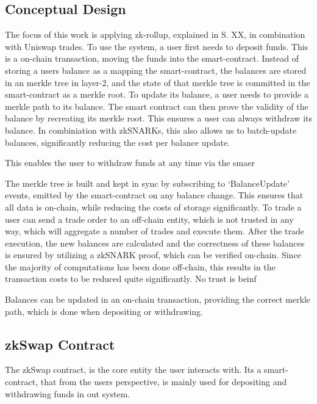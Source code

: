 \documentclass[../../thesis.tex]{subfiles}
\begin{document}
\subsection{Conceptual Design}
The focus of this work is applying zk-rollup, explained in S. XX, in combination with Uniswap trades. To use the system, a user first needs to deposit funds. This is a on-chain transaction, moving the funds into the smart-contract. Instead of storing a users balance as a mapping the smart-contract, the balances are stored in an merkle tree in layer-2, and the state of that merkle tree is committed in the smart-contract as a merkle root. To update its balance, a user needs to provide a merkle path to its balance. The smart contract can then prove the validity of the balance by recreating its merkle root. This ensures a user can always withdraw its balance. In combiniation with zkSNARKs, this also allows us to batch-update balances, significantly reducing the cost per balance update. 


This enables the user to withdraw funds at any time via the smaer


The merkle tree is built and kept in sync by subscribing to `BalanceUpdate' events, emitted by the smart-contract on any balance change. This ensures that all data is on-chain, while reducing the costs of storage significantly. To trade a user can send a trade order to an off-chain entity, which is not trusted in any way, which will aggregate a number of trades and execute them. After the trade execution, the new balances are calculated and the correctness of these balances is ensured by utilizing a zkSNARK proof, which can be verified on-chain. Since the majority of computations has been done off-chain, this results in the transaction costs to be reduced quite significantly. No trust is beinf

Balances can be updated in an on-chain transaction, providing the correct merkle path, which is done when depositing or withdrawing. 

\subsection{zkSwap Contract}
The zkSwap contract, is the core entity the user interacts with. Its a smart-contract, that from the users perspective, is mainly used for depositing and withdrawing funds in out system. 
\end{document}
